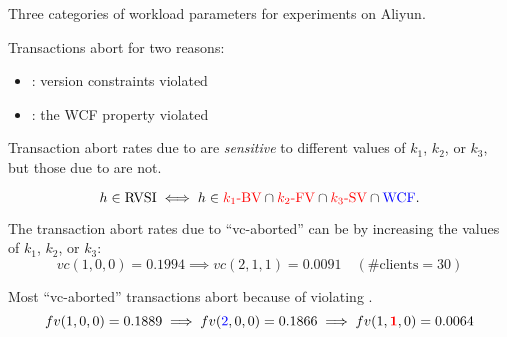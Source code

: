 \begin{frame}{}
  \centerline{Three categories of workload parameters for experiments on Aliyun.}
  
\end{frame}

\begin{frame}{}
  Transactions abort for two reasons:
  \begin{itemize}
    \item {}: \rvsi{} version constraints violated
    \item {}: the WCF property violated
  \end{itemize}

  \pause
  \vspace{0.60cm}
  Transaction abort rates due to  are \emph{sensitive} to different values of $k_1$, $k_2$, or $k_3$,
  \pause
  but those due to  are not.

  \pause
  \vspace{0.50cm}
  \[
    h \in \text{RVSI}{} \iff h \in \textcolor{red}{k_1\text{-BV}{}} \cap \textcolor{red}{k_2\text{-FV}{}} \cap \textcolor{red}{k_3\text{-SV}{}} \cap \textcolor{blue}{\text{WCF}{}}.
  \]

  \pause
  \vspace{0.80cm}
  \centerline{}
\end{frame}

\begin{frame}{}

  \pause
  The transaction abort rates due to ``vc-aborted'' \pause can be 
  by  increasing the values of $k_1$, $k_2$, or $k_3$:
  \[
    vc(1,0,0) = 0.1994 \implies vc(2,1,1) = 0.0091 \quad (\text{\#clients} = 30)
  \]
\end{frame}

\begin{frame}{}

  \pause
  Most ``vc-aborted'' transactions abort because of violating \red{$\ktwofv$}.
  \[
    fv(1,0,0) = 0.1889 \implies fv(\textcolor{blue}{2},0,0) = 0.1866 \implies fv(1,\textcolor{red}{\bf 1},0) = 0.0064
  \]
\end{frame}

